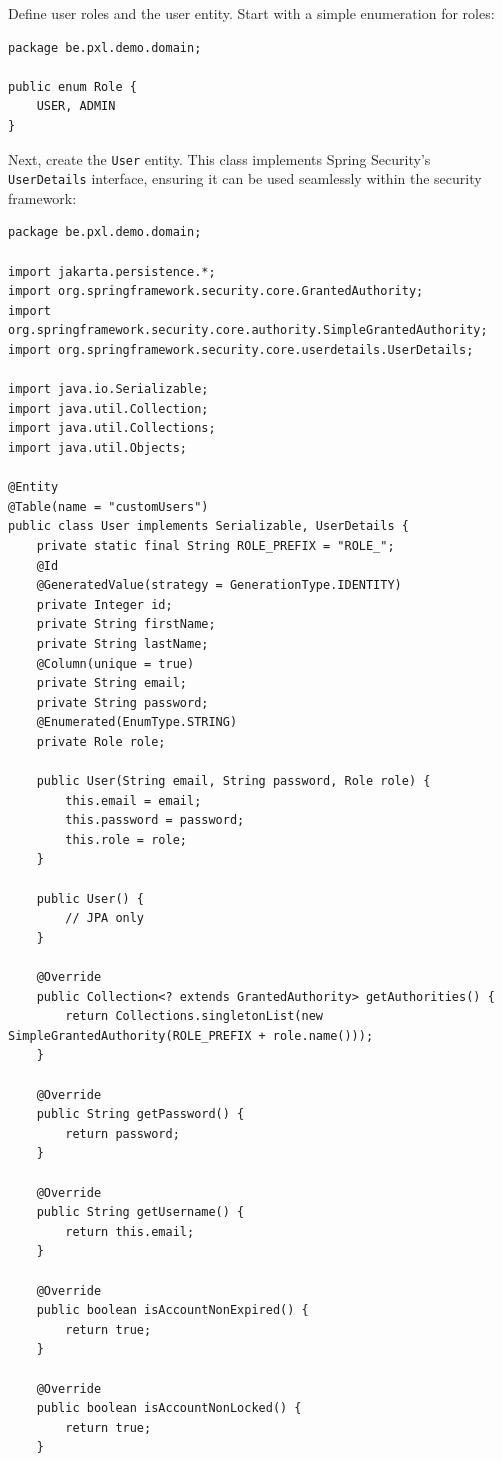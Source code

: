 Define user roles and the user entity. Start with a simple enumeration for roles:

\begin{lstlisting}
package be.pxl.demo.domain;

public enum Role {
    USER, ADMIN
}
\end{lstlisting}

Next, create the \texttt{User} entity. This class implements Spring Security’s \texttt{UserDetails} interface, ensuring it can be used seamlessly within the security framework:

\begin{lstlisting}
package be.pxl.demo.domain;

import jakarta.persistence.*;
import org.springframework.security.core.GrantedAuthority;
import org.springframework.security.core.authority.SimpleGrantedAuthority;
import org.springframework.security.core.userdetails.UserDetails;

import java.io.Serializable;
import java.util.Collection;
import java.util.Collections;
import java.util.Objects;

@Entity
@Table(name = "customUsers")
public class User implements Serializable, UserDetails {
    private static final String ROLE_PREFIX = "ROLE_";
    @Id
    @GeneratedValue(strategy = GenerationType.IDENTITY)
    private Integer id;
    private String firstName;
    private String lastName;
    @Column(unique = true)
    private String email;
    private String password;
    @Enumerated(EnumType.STRING)
    private Role role;

    public User(String email, String password, Role role) {
        this.email = email;
        this.password = password;
        this.role = role;
    }

    public User() {
        // JPA only
    }

    @Override
    public Collection<? extends GrantedAuthority> getAuthorities() {
        return Collections.singletonList(new SimpleGrantedAuthority(ROLE_PREFIX + role.name()));
    }

    @Override
    public String getPassword() {
        return password;
    }

    @Override
    public String getUsername() {
        return this.email;
    }

    @Override
    public boolean isAccountNonExpired() {
        return true;
    }

    @Override
    public boolean isAccountNonLocked() {
        return true;
    }


\end{lstlisting}
